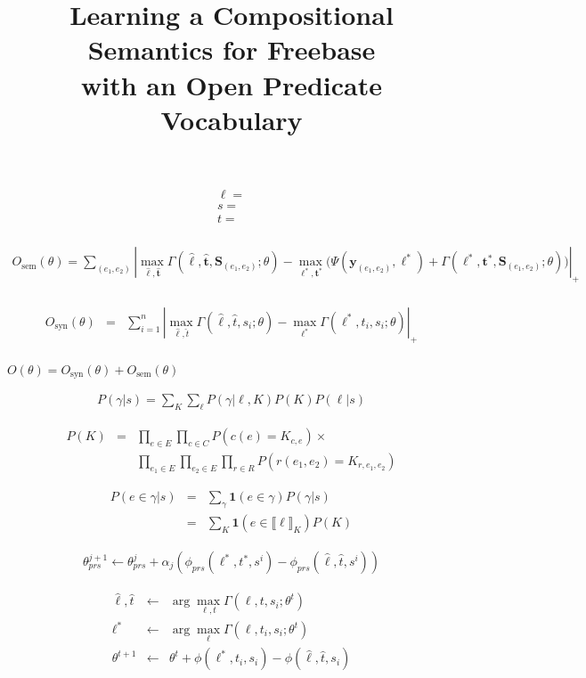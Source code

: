 \documentclass[11pt]{article}
\title{Learning a Compositional Semantics for Freebase \\ with an Open
  Predicate Vocabulary}
\date{}
\newcommand{\bS}{\textbf{S}}
\newcommand{\by}{\textbf{y}}
\newcommand{\bell}{\boldsymbol \ell}
\newcommand{\fsyn}{\ensuremath{O_{\mbox{syn}}}}
\newcommand{\fsem}{\ensuremath{O_{\mbox{sem}}}}
\newcommand{\bt}{\textbf{t}}
\begin{document}
\begin{eqnarray*}
\ell =  \\
s =   \\
t = \\
\end{eqnarray*}

\begin{eqnarray*}
\fsem{}(\theta)  = \sum_{(e_1, e_2)} | \max_{\hat{\bell}, \hat{\bt}} \Gamma(\hat{\bell},\hat{\bt{}},\bS{}_{(e_1, e_2)}; \theta)  - \max_{\bell^*, \bt^*} \big( \Psi(\by_{(e_1, e_2)}, \bell^*) + \Gamma(\bell^*,\bt{}^*,\bS{}_{(e_1, e_2)} ;\theta)\big) |_{+}\\
\end{eqnarray*}

\begin{eqnarray*}
\fsyn{}(\theta) & = & \sum_{i=1}^n |\max_{\hat{\ell}, \hat{t}} \Gamma(\hat{\ell}, \hat{t} , s_i; \theta) - \max_{\ell^*} \Gamma(\ell^*, t_i , s_i; \theta)|_{+} \\
\end{eqnarray*}

$O(\theta) = \fsyn{}(\theta) + \fsem{}(\theta)$


\begin{eqnarray*}
P(\gamma | s) = \sum_K \sum_\ell P(\gamma | \ell, K) P(K) P(\ell | s) 
\end{eqnarray*}


\begin{eqnarray*}
P(K) & = & \prod_{e \in E} \prod_{c \in C} P( c(e) = K_{c,e}) \times \\
 & & \prod_{e_1\in E} \prod_{e_2 \in E} \prod_{r \in R} P(r(e_1, e_2) = K_{r, e_1, e_2})
\end{eqnarray*}


\begin{eqnarray*}
P(e \in \gamma | s) & = & \sum_\gamma \textbf{1}(e \in \gamma) P(\gamma | s) \\
& = & \sum_K \textbf{1}(e \in \llbracket \ell \rrbracket_K) P(K)
\end{eqnarray*}

\begin{eqnarray*}
\theta_{prs}^{j+1} \leftarrow \theta_{prs}^j + \alpha_j ( \phi_{prs}(\ell^*, t^*, s^i) - \phi_{prs} (\hat{\ell}, \hat{t}, s^i))
\end{eqnarray*}


\begin{eqnarray*}
\hat{\ell}, \hat{t} & \leftarrow & \arg \max_{\ell, t} \Gamma(\ell, t , s_i; \theta^t) \\
\ell^* & \leftarrow & \arg \max_{\ell} \Gamma(\ell, t_i , s_i; \theta^t) \\
\theta^{t+1} & \leftarrow & \theta^t + \phi(\ell^*, t_i, s_i) - \phi(\hat{\ell}, \hat{t}, s_i)
\end{eqnarray*}
\end{document}
